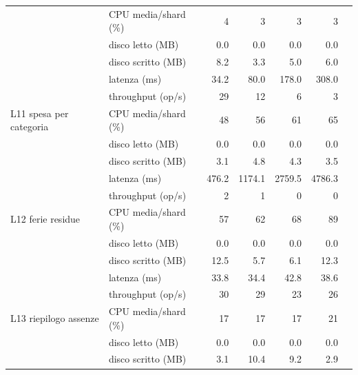 \begin{longtable}{@{}llrrrrr@{}}
 & CPU media/shard (\%) & 4 & 3 & 3 & 3 \\
 & disco letto (MB)   & 0.0 & 0.0 & 0.0 & 0.0 \\
 & disco scritto (MB) & 8.2 & 3.3 & 5.0 & 6.0 \\ \midrule
\multirow{5}{*}{L11 spesa per categoria} & latenza (ms)      & 34.2 & 80.0 & 178.0 & 308.0 \\
 & throughput (op/s)  & 29 & 12 & 6 & 3 \\
 & CPU media/shard (\%) & 48 & 56 & 61 & 65 \\
 & disco letto (MB)   & 0.0 & 0.0 & 0.0 & 0.0 \\
 & disco scritto (MB) & 3.1 & 4.8 & 4.3 & 3.5 \\ \midrule
\multirow{5}{*}{L12 ferie residue} & latenza (ms)      & 476.2 & 1174.1 & 2759.5 & 4786.3 \\
 & throughput (op/s)  & 2 & 1 & 0 & 0 \\
 & CPU media/shard (\%) & 57 & 62 & 68 & 89 \\
 & disco letto (MB)   & 0.0 & 0.0 & 0.0 & 0.0 \\
 & disco scritto (MB) & 12.5 & 5.7 & 6.1 & 12.3 \\ \midrule
\multirow{5}{*}{L13 riepilogo assenze} & latenza (ms)      & 33.8 & 34.4 & 42.8 & 38.6 \\
 & throughput (op/s)  & 30 & 29 & 23 & 26 \\
 & CPU media/shard (\%) & 17 & 17 & 17 & 21 \\
 & disco letto (MB)   & 0.0 & 0.0 & 0.0 & 0.0 \\
 & disco scritto (MB) & 3.1 & 10.4 & 9.2 & 2.9 \\ \midrule
\bottomrule
\end{longtable}
\endgroup
